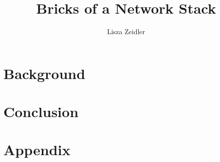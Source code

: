 \documentclass[diplominf, bibnum]{zihpub}
\author{Lisza Zeidler}
\title{Bricks of a Network Stack}
\begin{document}
\begin{thesisdocument}


%

\chapter{Background}
\label{Chapter:Background}


%

%

%

\chapter{Conclusion}
\label{Chapter:Discussion}


\cleardoublestandardpage

\cleardoublestandardpage
\listoffigures
\cleardoublestandardpage
{}      
\cleardoublestandardpage
\listoftables


\appendix
\chapter{Appendix}
\label{Appendix}


\end{thesisdocument}
\end{document}
